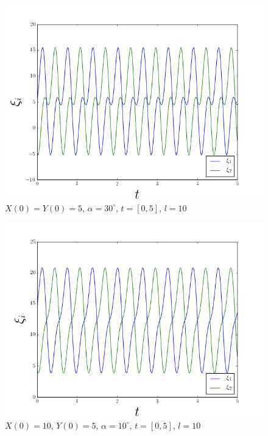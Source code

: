 \documentclass[a4paper,10pt]{article}
\numberwithin{equation}{section}
\begin{document}
\begin{figure}[H]
 \center 
 \includegraphics[scale=0.4]{problema1fig3}
 \caption{$X(0) = Y(0) = 5$, $\alpha = 30^\circ$, $t = [0,5]$, $l = 10$}
 \label{problema1fig3}
\end{figure}

\begin{figure}[H]
 \center 
 \includegraphics[scale=0.5]{problema1fig4}
 \caption{$X(0) = 10$, $Y(0) = 5$, $\alpha = 10^\circ$, $t = [0,5]$, $l = 10$}
 \label{problema1fig4}
\end{figure}
\end{document}

